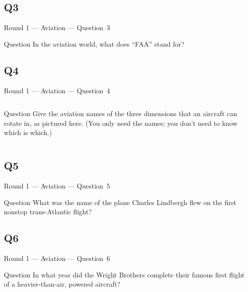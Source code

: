 \documentclass[11pt]{beamer}
\begin{document}
\subsection*{Q3}
\begin{frame}[t]{Round 1 --- Aviation --- \mbox{Question 3}}
\vspace{-0.5em}
\begin{block}{Question}
In the aviation world, what does ``FAA'' stand for?
\end{block}
\end{frame}
\subsection*{Q4}
\begin{frame}[t]{Round 1 --- Aviation --- \mbox{Question 4}}
\vspace{-0.5em}
\begin{columns}[T,totalwidth=\linewidth]
\begin{column}{0.32\linewidth}
\begin{block}{Question}
Give the aviation names of the three dimensions that an aircraft can rotate in, as pictured here. (You only need the names; you don't need to know which is which.)
\end{block}
\end{column}
\begin{column}{0.65\linewidth}
\begin{center}
\texttt{[image: \{Images/rollpitchyaw]}.png}
\end{center}
\end{column}
\end{columns}
\end{frame}
\subsection*{Q5}
\begin{frame}[t]{Round 1 --- Aviation --- \mbox{Question 5}}
\vspace{-0.5em}
\begin{block}{Question}
What was the name of the plane Charles Lindbergh flew on the first nonstop trans-Atlantic flight?
\end{block}
\end{frame}
\subsection*{Q6}
\begin{frame}[t]{Round 1 --- Aviation --- \mbox{Question 6}}
\vspace{-0.5em}
\begin{block}{Question}
In what year did the Wright Brothers complete their famous first flight of a heavier-than-air, powered aircraft?
\end{block}
\end{frame}
\end{document}
